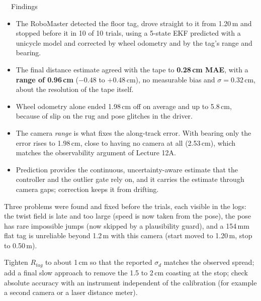\label{sec:conclusions}

\begin{keybox}{\faCheckCircle\ \ Findings}
\begin{itemize}
  \item The RoboMaster detected the floor tag, drove straight to it from 1.20\,m and stopped before it in 10 of 10
        trials, using a 5-state EKF predicted with a unicycle model and corrected by wheel odometry and by the tag's
        range and bearing.
  \item The final distance estimate agreed with the tape to \textbf{0.28\,cm MAE}, with a \textbf{range of 0.96\,cm}
        ($-0.48$ to $+0.48$\,cm), no measurable bias and $\sigma=0.32$\,cm, about the resolution of the tape itself.
  \item Wheel odometry alone ended 1.98\,cm off on average and up to 5.8\,cm, because of slip on the rug and pose
        glitches in the driver.
  \item The camera \emph{range} is what fixes the along-track error. With bearing only the error rises to 1.98\,cm,
        close to having no camera at all (2.53\,cm), which matches the observability argument of Lecture 12A.
  \item Prediction provides the continuous, uncertainty-aware estimate that the controller and the outlier gate rely
        on, and it carries the estimate through camera gaps; correction keeps it from drifting.
\end{itemize}
\end{keybox}

 Three problems were found and fixed before the trials, each visible in
the logs: the  twist field is late and too large (speed is now taken from the pose), the pose has rare
impossible jumps (now skipped by a plausibility guard), and a 154\,mm flat tag is unreliable beyond 1.2\,m with this
camera (start moved to 1.20\,m, stop to 0.50\,m).

 Tighten $R_{tag}$ to about 1\,cm so that the reported $\sigma_d$ matches the observed spread; add a
final slow approach to remove the 1.5 to 2\,cm coasting at the stop; check absolute accuracy with an instrument independent
of the calibration (for example a second camera or a laser distance meter).

\appendix
{}
\label{sec:repro}

